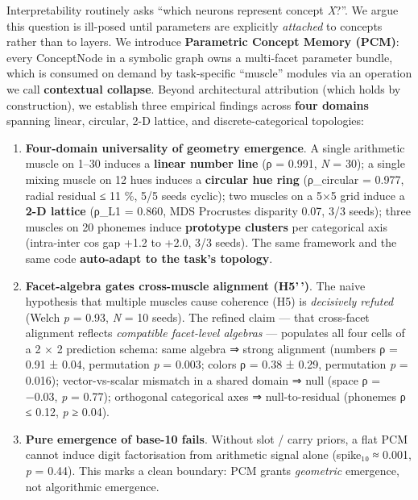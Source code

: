 Interpretability routinely asks ``which neurons represent concept \emph{X}?''. We
argue this question is ill-posed until parameters are explicitly
\emph{attached} to concepts rather than to layers. We introduce \textbf{Parametric
Concept Memory (PCM)}: every ConceptNode in a symbolic graph owns a
multi-facet parameter bundle, which is consumed on demand by task-specific
``muscle'' modules via an operation we call \textbf{contextual collapse}. Beyond
architectural attribution (which holds by construction), we establish
three empirical findings across \textbf{four domains} spanning linear,
circular, 2-D lattice, and discrete-categorical topologies:

\begin{enumerate}
\def\labelenumi{\arabic{enumi}.}
\tightlist
\item
  \textbf{Four-domain universality of geometry emergence}. A single
  arithmetic muscle on 1--30 induces a \textbf{linear number line}
  (ρ = 0.991, \emph{N} = 30); a single mixing muscle on 12 hues induces
  a \textbf{circular hue ring} (ρ\_circular = 0.977, radial residual ≤ 11 \%,
  5/5 seeds cyclic); two muscles on a 5×5 grid induce a \textbf{2-D
  lattice} (ρ\_L1 = 0.860, MDS Procrustes disparity 0.07, 3/3 seeds);
  three muscles on 20 phonemes induce \textbf{prototype clusters} per
  categorical axis (intra-inter cos gap +1.2 to +2.0, 3/3 seeds).
  The same framework and the same code \textbf{auto-adapt to the task's
  topology}.
\item
  \textbf{Facet-algebra gates cross-muscle alignment (H5'\,')}. The naive
  hypothesis that multiple muscles cause coherence (H5) is
  \emph{decisively refuted} (Welch \emph{p} = 0.93, \emph{N} = 10 seeds). The
  refined claim --- that cross-facet alignment reflects \emph{compatible
  facet-level algebras} --- populates all four cells of a 2 × 2
  prediction schema: same algebra ⇒ strong alignment (numbers
  ρ = 0.91 ± 0.04, permutation \emph{p} = 0.003; colors
  ρ = 0.38 ± 0.29, permutation \emph{p} = 0.016); vector-vs-scalar
  mismatch in a shared domain ⇒ null (space ρ = −0.03, \emph{p} = 0.77);
  orthogonal categorical axes ⇒ null-to-residual (phonemes
  \textbar ρ\textbar{} ≤ 0.12, \emph{p} ≥ 0.04).
\item
  \textbf{Pure emergence of base-10 fails}. Without slot / carry priors, a
  flat PCM cannot induce digit factorisation from arithmetic signal
  alone (spike₁₀ ≈ 0.001, \emph{p} = 0.44). This marks a clean boundary:
  PCM grants \emph{geometric} emergence, not algorithmic emergence.
\end{enumerate}

